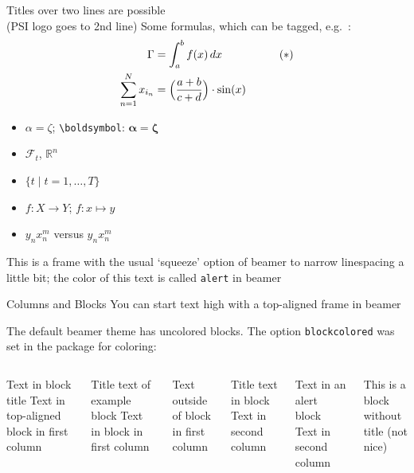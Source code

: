 \documentclass[aspectratio=43]{beamer}
\begin{document}
\begin{frame}[squeeze]{Titles over two lines are possible\\
    (PSI logo goes to 2nd line)}
  Some formulas, which can be tagged, e.g.\ \thetag{$\ast$}:
  \begin{align*}
    \Gamma  & = \int_a^b f(x)\,dx             && \tag{$\ast$}\\
    \sum_{n=1}^N x_{i_n} &= \Bigl(\frac{a+b}{c+d}\Bigr)\cdot \sin(x)  &&
  \end{align*}
  \begin{itemize}
  \item  $\alpha = \zeta$; \texttt{\textbackslash boldsymbol}: $\boldsymbol{\alpha} = \boldsymbol{\zeta}$ 
  \item $\mathcal{F}_t$, $\mathbb{R}^n$
  \item $\{t \mid t=1,\dots,T\}$
  \item $f\colon X\to Y$; $f\colon x\mapsto y$
  \item $y_nx_n^m$ versus $y_n^{}x_n^m$
  \end{itemize}
   \alert{This is a frame with the usual `squeeze' option of beamer to narrow linespacing a little bit; the color of this text is called \texttt{alert} in beamer}
  
\end{frame}

\begin{frame}[t]{Columns and Blocks}
  You can start text high with a top-aligned frame in beamer

 The default beamer theme has uncolored blocks. The option \texttt{blockcolored} was set in the package for coloring: 
  \begin{columns}
      \begin{block}{Text in block title}
        Text in top-aligned block in first column
      \end{block}
      \begin{exampleblock}{Title text of example block}
        Text in block in first column
      \end{exampleblock}
      Text outside of block in first column
      \begin{block}{Title text in block}
        Text in second column 
      \end{block}
      \begin{alertblock}{Text in an alert block}
        Text in second column
      \end{alertblock}
      \begin{block}{}
        This is a block without title (not nice)
      \end{block}
  \end{columns}  
 \end{frame}
 
\end{document}
